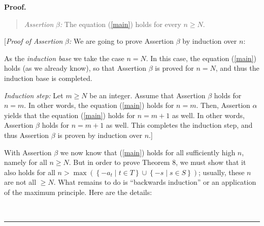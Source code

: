 \documentclass[numbers=enddot,12pt,final,onecolumn,notitlepage]{scrartcl}%
\numberwithin{exer}{section}
\theoremstyle{definition}
\newenvironment{statement}{\begin{quote}}{\end{quote}}
\newenvironment{proof}[1][Proof]{\noindent\textbf{#1.} }{\ \rule{0.5em}{0.5em}}
\begin{document}
\begin{proof}
\begin{statement}
\textit{Assertion }$\beta$\textit{:} The equation (\ref{main}) holds for every
$n\geq N$.
\end{statement}

[\textit{Proof of Assertion }$\beta$\textit{:} We are going to prove Assertion
$\beta$ by induction over $n$:

As the \textit{induction base} we take the case $n=N$. In this case, the
equation (\ref{main}) holds (as we already know), so that Assertion $\beta$ is
proved for $n=N$, and thus the induction base is completed.

\textit{Induction step:} Let $m\geq N$ be an integer. Assume that Assertion
$\beta$ holds for $n=m$. In other words, the equation (\ref{main}) holds for
$n=m$. Then, Assertion $\alpha$ yields that the equation (\ref{main}) holds
for $n=m+1$ as well. In other words, Assertion $\beta$ holds for $n=m+1$ as
well. This completes the induction step, and thus Assertion $\beta$ is proven
by induction over $n$.]

With Assertion $\beta$ we now know that (\ref{main}) holds for all
sufficiently high $n$, namely for all $n\geq N$. But in order to prove Theorem
8, we must show that it also holds for all $n>\max\left(  \left\{  -a_{t}\mid
t\in T\right\}  \cup\left\{  -s\mid s\in S\right\}  \right)  $; usually, these
$n$ are not all $\geq N$. What remains to do is ``backwards induction'' or an
application of the maximum principle. Here are the details:


\end{proof}
\end{document}
